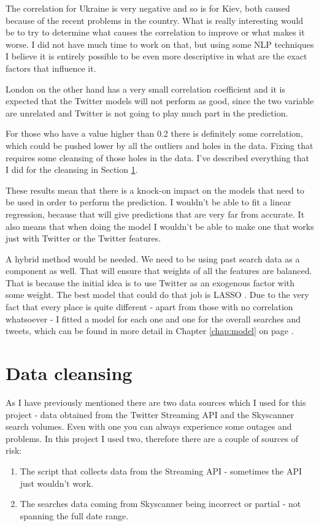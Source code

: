 \documentclass[minf,twoside,singlespacing,parskip,frontabs,notimes,11pt]{infthesis}
\begin{document}
The correlation for Ukraine is very negative and so is for Kiev, both caused because of the recent problems in the country. What is really interesting would be to try to determine what causes the correlation to improve or what makes it worse. I did not have much time to work on that, but using some NLP techniques I believe it is entirely possible to be even more descriptive in what are the exact factors that influence it. 

London on the other hand has a very small correlation coefficient and it is expected that the Twitter models will not perform as good, since the two variable are unrelated and Twitter is not going to play much part in the prediction. 


For those who have a value higher than 0.2 there is definitely some correlation, which could be pushed lower by all the outliers and holes in the data. Fixing that requires some cleansing of those holes in the data. I've described everything that I did for the cleansing in Section \ref{sec:cleansing}.


These results mean that there is a knock-on impact on the models that need to be used in order to perform the prediction. I wouldn't be able to fit a linear regression, because that will give predictions that are very far from accurate. It also means that when doing the model I wouldn't be able to make one that works just with Twitter or the Twitter features. 

A hybrid method would be needed. We need to be using past search data as a component as well. That will ensure that weights of all the features are balanced. That is because the initial idea is to use Twitter as an exogenous factor with some weight. The best model that could do that job is LASSO \cite{lasso}. Due to the very fact that every place is quite different - apart from those with no correlation whatsoever - I fitted a model for each one and one for the overall searches and tweets, which can be found in more detail in Chapter \ref{chap:model} on page \pageref{chap:model}.


\section{Data cleansing}
\label{sec:cleansing}


As I have previously mentioned there are two data sources which I used for this project - data obtained from the Twitter Streaming API and the Skyscanner search volumes. Even with one you can always experience some outages and problems. In this project I used two, therefore there are a couple of sources of risk:
\begin{enumerate}
\item The script that collects data from the Streaming API - sometimes the API just wouldn't work. 
\item The searches data coming from Skyscanner being incorrect or partial - not spanning the full date range.
\end{enumerate}
\end{document}
